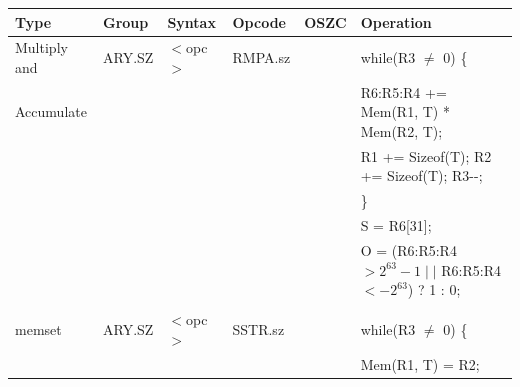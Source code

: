\begin{table}
\begin{subtable}{\linewidth}
\begin{center}
\scriptsize
\begin{tabular}{llllll}
\hline
Type               & Group             & Syntax                                & Opcode            & OSZC              & Operation                                                                     \\ \hline
Multiply and       & ARY.SZ            & $<$opc$>$                             & RMPA.sz           & \flags{!!--}      & while(R3 $\ne$ 0) \{                                                          \\
Accumulate         &                   &                                       &                   &                   & \quad R6:R5:R4 += Mem(R1, T) * Mem(R2, T);                                    \\
                   &                   &                                       &                   &                   & \quad R1 += Sizeof(T); R2 += Sizeof(T); R3-{}-;                               \\
                   &                   &                                       &                   &                   & \}                                                                            \\
                   &                   &                                       &                   &                   & S = R6[31];                                                                   \\
                   &                   &                                       &                   &                   & O = (R6:R5:R4 $> 2^{63} - 1 \mid\mid$ R6:R5:R4 $< -2^{63}$) ? 1 : 0;          \\
                   &                   &                                       &                   &                   &                                                                               \\
memset             & ARY.SZ            & $<$opc$>$                             & SSTR.sz           & \flags{----}      & while(R3 $\ne$ 0) \{                                                          \\
                   &                   &                                       &                   &                   & \quad Mem(R1, T) = R2;                                                        \\

\end{tabular}
\end{center}
\end{subtable}
\end{table}
